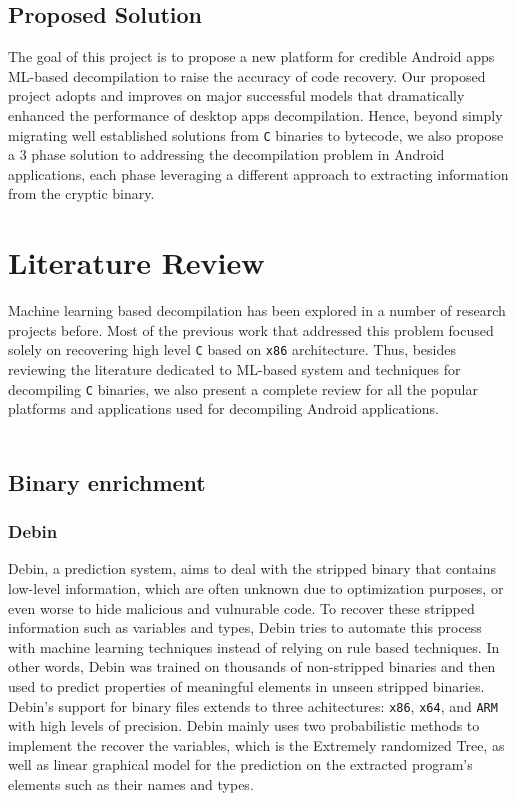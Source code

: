 \documentclass{article}
\begin{document}
\subsection{Proposed Solution}
The goal of this project is to propose a new platform for credible Android apps ML-based decompilation to raise the accuracy of code recovery.
Our proposed project adopts and improves on major successful models that dramatically enhanced the performance of desktop apps decompilation.
Hence, beyond simply migrating well established solutions from \verb|C| binaries to bytecode, we also propose a 3 phase solution to addressing the decompilation problem in Android applications, each phase leveraging a different approach to extracting information from the cryptic binary.

\section{Literature Review}
Machine learning based decompilation has been explored in a number of research projects before.
Most of the previous work that addressed this problem focused solely on recovering high level \verb|C| based on \verb|x86| architecture.
Thus, besides reviewing the literature dedicated to ML-based system and techniques for decompiling \verb|C| binaries, we also present a complete review for all the popular platforms and applications used for decompiling Android applications. \\\\


\subsection{Binary enrichment}

\subsubsection{Debin}

Debin, a prediction system, aims to deal with the stripped binary that contains low-level information, which are often unknown due to optimization purposes, or even worse to hide malicious and vulnurable code.
To recover these stripped information such as variables and types, Debin tries to automate this process with machine learning techniques instead of relying on rule based techniques. In other words, Debin was trained on thousands of non-stripped binaries and then used to predict properties of meaningful elements in unseen stripped binaries.
Debin's support for binary files extends to three achitectures: \verb|x86|, \verb|x64|, and \verb|ARM| with high levels of precision.
Debin mainly uses two probabilistic methods to implement the recover the variables, which is the Extremely randomized Tree, as well as linear graphical model for the prediction on the extracted program's elements such as their names and types.
\end{document}
